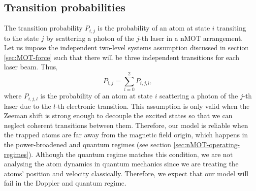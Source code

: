 \subsection{Transition probabilities}
\label{sec:transition-probabilities}

The transition probability $ P_{i,j} $ is the probability of an atom at state $ i $ transiting to the state $ j $ by scattering a photon of the $j$-th laser in a nMOT arrangement. Let us impose the independent two-level systems assumption discussed in section \ref{sec:MOT-force} such that there will be three independent transitions for each laser beam. Thus,
\begin{equation}
    P_{i,j} = \sum_{l = 0}^{2} P_{i,j,l},
\end{equation}
where $ P_{i,j,l} $ is the probability of an atom at state $ i $ scattering a photon of the $j$-th laser due to the $l$-th electronic transition. This assumption is only valid when the Zeeman shift is strong enough to decouple the excited states so that we can neglect coherent transitions between them. Therefore, our model is reliable when the trapped atoms are far away from the magnetic field origin, which happens in the power-broadened and quantum regimes (see section \ref{sec:nMOT-operating-regimes}). Although the quantum regime matches this condition, we are not analysing the atom dynamics in quantum mechanics since we are treating the atoms' position and velocity classically. Therefore, we expect that our model will fail in the Doppler and quantum regime.

